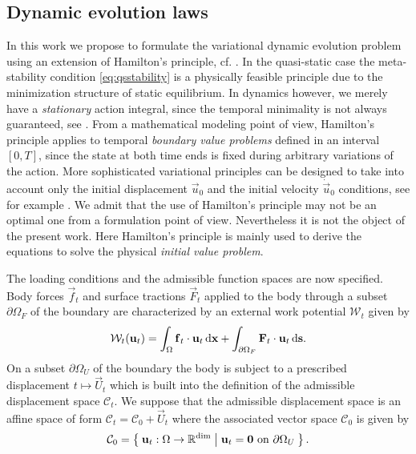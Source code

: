 \subsection{Dynamic evolution laws}
In this work we propose to formulate the variational dynamic evolution problem using an extension of Hamilton's principle, cf. \cite{Hamilton:1834}. In the quasi-static case the meta-stability condition \eqref{eq:qsstability} is a physically feasible principle due to the minimization structure of static equilibrium. In dynamics however, we merely have a \emph{stationary} action integral, since the temporal minimality is not always guaranteed, see \cite{Gray:2007aa}. From a mathematical modeling point of view, Hamilton's principle applies to temporal \emph{boundary value problems} defined in an interval $[0,T]$, since the state at both time ends is fixed during arbitrary variations of the action. More sophisticated variational principles can be designed to take into account only the initial displacement $\vec{u}_0$ and the initial velocity $\dot{\vec{u}}_0$ conditions, see for example \cite{Gurtin:1964aa}. We admit that the use of Hamilton's principle may not be an optimal one from a formulation point of view. Nevertheless it is not the object of the present work. Here Hamilton's principle is mainly used to derive the equations to solve the physical \emph{initial value problem}.

The loading conditions and the admissible function spaces are now specified. Body forces $\vec{f}_t$ and surface tractions $\vec{F}_t$ applied to the body through a subset $\partial\Omega_F$ of the boundary are characterized by an external work potential $\mathcal{W}_t$ given by
\begin{equation} \label{eq:power}
\mathcal{W}_t(\vec{u}_t)=\int_\Omega\vec{f}_t\cdot\vec{u}_t\dx+\int_{\partial\Omega_F}\vec{F}_t\cdot\vec{u}_t\D{\vec{s}}.
\end{equation}
On a subset $\partial\Omega_U$ of the boundary the body is subject to a prescribed displacement $t\mapsto \vec{U}_t$ which is built into the definition of the admissible displacement space $\mathcal{C}_t$. We suppose that the admissible displacement space is an affine space of form $\mathcal{C}_t=\mathcal{C}_0+\vec{U}_t$ where the associated vector space $\mathcal{C}_0$ is given by
\begin{equation} \label{eq:C0}
\mathcal{C}_0=\set{\vec{u}_t:\Omega\to\mathbb{R}^\mathrm{dim}|\vec{u}_t=\vec{0}\text{ on }\partial\Omega_U}.
\end{equation}


